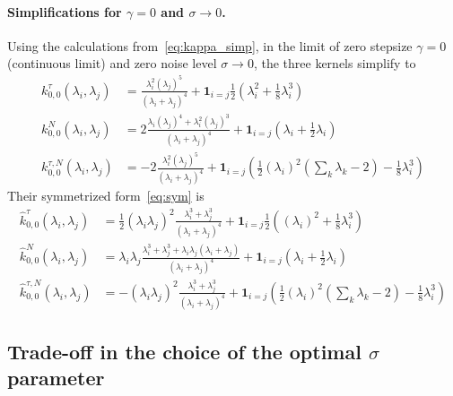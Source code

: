 \documentclass[11pt]{article}
\begin{document}
\paragraph{Simplifications for $\gamma=0$ and $\sigma \to 0$.} Using the calculations from~\eqref{eq:kappa_simp}, in the limit of zero stepsize $\gamma=0$ (continuous limit) and zero noise level $\sigma \to 0$, the three kernels simplify to 
\begin{align*}
    k_{0, 0}^\tau (\lambda_i, \lambda_j) &= \frac{ \lambda_i^2 (\lambda_j)^5}{(\lambda_i + \lambda_j)^4} +  \mathbf{1}_{i=j} \frac{1}{2} \left( \lambda_i^2  + \frac{1}{8} \lambda_i^3\right)\\ 
    k_{0, 0}^N (\lambda_i, \lambda_j) &=  2 \frac{ \lambda_i(\lambda_j)^4 + \lambda_i^2 (\lambda_j)^3}{(\lambda_i + \lambda_j)^4} + \mathbf{1}_{i=j}\left(  \lambda_i + \frac{1}{2} \lambda_i \right) \\
    k_{0, 0}^{\tau, N} (\lambda_i, \lambda_j) &= 
- 2 \frac{ \lambda_i^2 (\lambda_j)^5}{(\lambda_i + \lambda_j)^4} + \mathbf{1}_{i=j} \left(\frac{1}{2}(\lambda_i)^2 \left( \sum_k \lambda_k - 2 \right)  - \frac{1}{8} \lambda_i^3\right) 
\end{align*}
Their symmetrized form~\eqref{eq:sym} is 
\begin{align} \label{eq:ktau_simp}
    \hat k_{0, 0}^\tau (\lambda_i, \lambda_j) &= \frac{1}{2}(\lambda_i \lambda_j)^2 \frac{ \lambda_i^3 + \lambda_j^3}{(\lambda_i + \lambda_j)^4} +  \mathbf{1}_{i=j} \frac{1}{2} \left( \left(\lambda_i\right)^2  + \frac{1}{8} \lambda_i^3\right)\\ \label{eq:kN_simp}
    \hat k_{0, 0}^N (\lambda_i, \lambda_j) &= \lambda_i \lambda_j \frac{\lambda_i^3 + \lambda_j^3 + \lambda_i \lambda_j(\lambda_i + \lambda_j)}{(\lambda_i + \lambda_j)^4} + \mathbf{1}_{i=j}\left(  \lambda_i + \frac{1}{2} \lambda_i \right) \\ \label{eq:ktauN_simp}
    \hat k_{0, 0}^{\tau, N} (\lambda_i, \lambda_j) &= 
- (\lambda_i \lambda_j)^2 \frac{ \lambda_i^3 + \lambda_j^3}{(\lambda_i + \lambda_j)^4} + \mathbf{1}_{i=j} \left(\frac{1}{2}(\lambda_i)^2 \left( \sum_k \lambda_k - 2 \right)  - \frac{1}{8} \lambda_i^3\right) 
\end{align}
\subsection{Trade-off in the choice of the optimal $\sigma$ parameter}
\label{app:analysis_Langevin}
\end{document}
